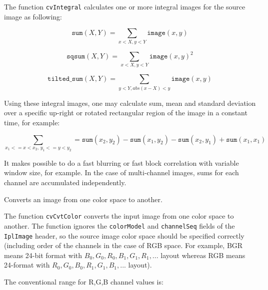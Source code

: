 The function \texttt{cvIntegral} calculates one or more integral images for the source image as following:

\[
\texttt{sum}(X,Y) = \sum_{x<X,y<Y} \texttt{image}(x,y)
\]

\[
\texttt{sqsum}(X,Y) = \sum_{x<X,y<Y} \texttt{image}(x,y)^2
\]

\[
\texttt{tilted\_sum}(X,Y) = \sum_{y<Y,abs(x-X)<y} \texttt{image}(x,y)
\]

Using these integral images, one may calculate sum, mean and standard deviation over a specific up-right or rotated rectangular region of the image in a constant time, for example:

\[
\sum_{x_1<=x<x_2, \, y_1<=y<y_2} = \texttt{sum}(x_2,y_2)-\texttt{sum}(x_1,y_2)-\texttt{sum}(x_2,y_1)+\texttt{sum}(x_1,x_1)
\]

It makes possible to do a fast blurring or fast block correlation with variable window size, for example. In the case of multi-channel images, sums for each channel are accumulated independently.

\label{CvtColor}

Converts an image from one color space to another.


\begin{description}
\end{description}

The function \texttt{cvCvtColor} converts the input image from one color
space to another. The function ignores the \texttt{colorModel} and
\texttt{channelSeq} fields of the \texttt{IplImage} header, so the
source image color space should be specified correctly (including
order of the channels in the case of RGB space. For example, BGR means 24-bit
format with $B_0, G_0, R_0, B_1, G_1, R_1, ...$ layout
whereas RGB means 24-format with $R_0, G_0, B_0, R_1, G_1, B_1, ...$
layout).

The conventional range for R,G,B channel values is:

